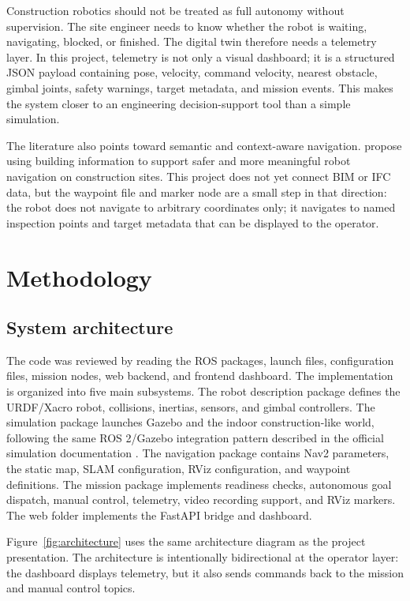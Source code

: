 \documentclass[12pt,a4paper]{article}
\begin{document}
Construction robotics should not be treated as full autonomy without supervision. The site engineer needs to know whether the robot is waiting, navigating, blocked, or finished. The digital twin therefore needs a telemetry layer. In this project, telemetry is not only a visual dashboard; it is a structured JSON payload containing pose, velocity, command velocity, nearest obstacle, gimbal joints, safety warnings, target metadata, and mission events. This makes the system closer to an engineering decision-support tool than a simple simulation.

The literature also points toward semantic and context-aware navigation. \citet{karimi2021semantic} propose using building information to support safer and more meaningful robot navigation on construction sites. This project does not yet connect BIM or IFC data, but the waypoint file and marker node are a small step in that direction: the robot does not navigate to arbitrary coordinates only; it navigates to named inspection points and target metadata that can be displayed to the operator.

\section{Methodology}

\subsection{System architecture}

The code was reviewed by reading the ROS packages, launch files, configuration files, mission nodes, web backend, and frontend dashboard. The implementation is organized into five main subsystems. The robot description package defines the URDF/Xacro robot, collisions, inertias, sensors, and gimbal controllers. The simulation package launches Gazebo and the indoor construction-like world, following the same ROS 2/Gazebo integration pattern described in the official simulation documentation \citep{ros2gazebo}. The navigation package contains Nav2 parameters, the static map, SLAM configuration, RViz configuration, and waypoint definitions. The mission package implements readiness checks, autonomous goal dispatch, manual control, telemetry, video recording support, and RViz markers. The web folder implements the FastAPI bridge and dashboard.

Figure~\ref{fig:architecture} uses the same architecture diagram as the project presentation. The architecture is intentionally bidirectional at the operator layer: the dashboard displays telemetry, but it also sends commands back to the mission and manual control topics.
\end{document}
